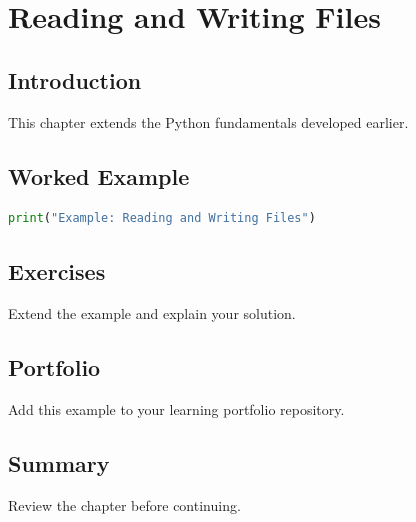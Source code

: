 \chapter{Reading and Writing Files}
\label{chap:vol3-14}



\section{Introduction}
This chapter extends the Python fundamentals developed earlier.

\section{Worked Example}
\begin{lstlisting}[language=Python]
print("Example: Reading and Writing Files")
\end{lstlisting}

\section{Exercises}
\begin{exercise}
Extend the example and explain your solution.
\end{exercise}

\section{Portfolio}
Add this example to your learning portfolio repository.

\section{Summary}
Review the chapter before continuing.
